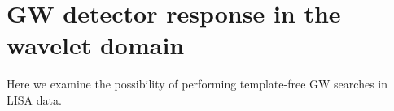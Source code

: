 \documentclass{article}
\begin{document}


\section{GW detector response in the wavelet domain}

Here we examine the possibility of performing template-free GW searches in LISA data.
\end{document}
